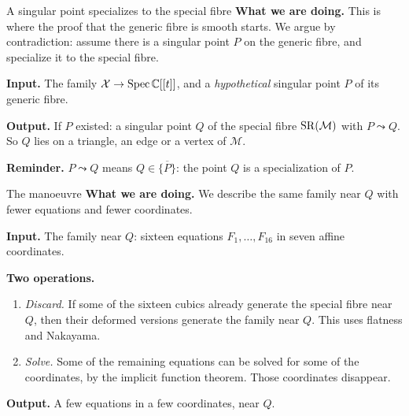 \begin{frame}{A singular point specializes to the special fibre}
\textbf{What we are doing.} This is where the proof that the generic fibre is smooth starts. We argue by contradiction: assume there is a singular point \(P\) on the generic fibre, and specialize it to the special fibre.
\par\bigskip
\textbf{Input.} The family \(\mathcal X\to\operatorname{Spec}\mathbb C[[t]]\), and a \emph{hypothetical} singular point \(P\) of its generic fibre.
\par\bigskip
\textbf{Output.} If \(P\) existed: a singular point \(Q\) of the special fibre \(\operatorname{SR}(\mathcal M)\) with \(P\leadsto Q\). So \(Q\) lies on a triangle, an edge or a vertex of \(\mathcal M\).
\par\bigskip
\textbf{Reminder.} \(P\leadsto Q\) means \(Q\in\overline{\{P\}}\): the point \(Q\) is a specialization of \(P\).
\end{frame}

\begin{frame}{The manoeuvre}
\textbf{What we are doing.} We describe the same family near \(Q\) with fewer equations and fewer coordinates.
\par\bigskip
\textbf{Input.} The family near \(Q\): sixteen equations \(F_1,\dots,F_{16}\) in seven affine coordinates.
\par\bigskip
\textbf{Two operations.}
\begin{enumerate}
\setlength{\itemsep}{8pt}
\item \emph{Discard.} If some of the sixteen cubics already generate the special fibre near \(Q\), then their deformed versions generate the family near \(Q\). This uses flatness and Nakayama.
\item \emph{Solve.} Some of the remaining equations can be solved for some of the coordinates, by the implicit function theorem. Those coordinates disappear.
\end{enumerate}
\par\bigskip
\textbf{Output.} A few equations in a few coordinates, near \(Q\).
\end{frame}

